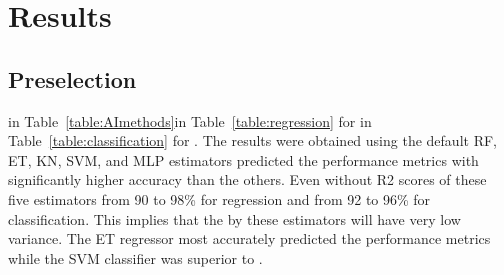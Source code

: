 \section{Results}

\subsection{Preselection}
\DIFdelbegin {}\DIFdelend \DIFaddbegin

    \DIFaddend in Table~\ref{table:AImethods}\DIFdelbegin {}\DIFdelend \DIFaddbegin {}\DIFaddend in Table~\ref{table:regression} for \DIFdelbegin {}\DIFdelend \DIFaddbegin {}\DIFaddend in Table~\ref{table:classification} for \DIFdelbegin {}\DIFdelend \DIFaddbegin {}\DIFaddend . The results were obtained using the default \DIFdelbegin {}\DIFdelend \DIFaddbegin {}\DIFaddend \gls{RF}, \gls{ET}, \gls{KN}, \DIFdelbegin %
\DIFdelend \DIFaddbegin \gls{SVM}\DIFaddend , and \gls{MLP} estimators predicted the performance metrics with significantly higher accuracy than the others. Even without \DIFdelbegin {}\DIFdelend \DIFaddbegin {}\gls{R2} \DIFaddend scores of these five estimators \DIFdelbegin {}\DIFdelend \DIFaddbegin {}\DIFaddend from 90 to 98\% for regression and from 92 to 96\% for classification. This implies that the \DIFdelbegin {}\DIFdelend \DIFaddbegin {}\DIFaddend by these estimators will have very low variance. The \gls{ET} regressor most accurately predicted the performance metrics while the \DIFdelbegin %
\DIFdelend \DIFaddbegin \gls{SVM} \DIFaddend classifier was superior to \DIFdelbegin {}\DIFdelend \DIFaddbegin {}\DIFaddend .

